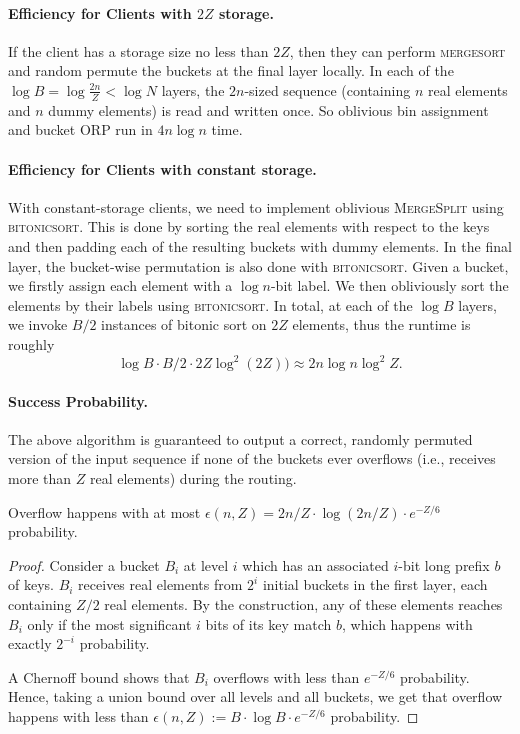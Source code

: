 \paragraph{Efficiency for Clients with $2Z$ storage.}

If the client has a storage size no less than $2Z$, then they can perform \textsc{mergesort} and random permute the buckets at the final layer locally. In each of the $\log B = \log \frac{2n}{Z} < \log N$ layers, the $2n$-sized sequence (containing $n$ real elements and $n$ dummy elements) is read  and written once. So oblivious bin assignment and bucket ORP run in $4n\log n$ time. 

\paragraph{Efficiency for Clients with constant storage.}

With constant-storage clients, we need to implement oblivious \textsc{MergeSplit} using \textsc{bitonicsort}. This is done by sorting the real elements with respect to the keys and then padding each of the resulting buckets with dummy elements. In the final layer, the bucket-wise permutation is also done with \textsc{bitonicsort}. Given a bucket, we firstly assign  each  element  with a  $\log n$-bit label. We then obliviously  sort  the  elements  by  their  labels using  \textsc{bitonicsort}.  In total, at each of the $\log B$ layers, we invoke $B/2$ instances of bitonic sort on $2Z$ elements, thus the  runtime  is  roughly  \[\log B\cdot B/2\cdot 2Z\log^2(2Z))\approx 2n\log n\log^2Z.\]

\paragraph{Success Probability.} The above algorithm is guaranteed to output a correct, randomly permuted version of the input sequence if none of the buckets ever overflows (i.e., receives more than $Z$ real elements) during the routing.

\begin{lemma}
    Overflow happens  with  at most $\epsilon(n,Z) =2n/Z\cdot\log(2n/Z)\cdot e^{-Z/6}$ probability.
\end{lemma}

\begin{proof}
    Consider a bucket $B_i$ at level $i$ which has an associated $i$-bit long prefix $b$ of keys. $B_i$ receives real  elements from $2^i$ initial buckets in the first layer,  each  containing $Z/2$ real  elements. By the construction, any of these elements reaches $B_i$ only if the most significant $i$ bits  of its  key match $b$, which happens with exactly $2^{-i}$ probability. 
    
    A Chernoff bound  shows that $B_i$ overflows  with  less  than $e^{-Z/6}$ probability. Hence, taking a union  bound  over  all  levels and all buckets, we get that overflow happens with less than $\epsilon(n,Z) := B\cdot \log B\cdot e^{-Z/6}$ probability.
\end{proof}




